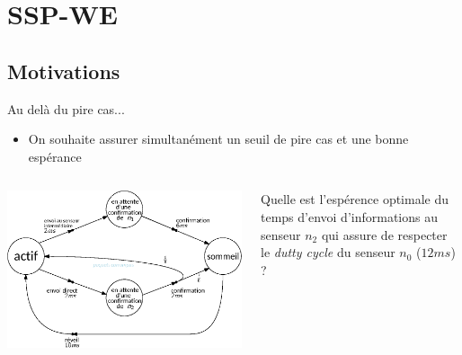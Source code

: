 \documentclass[compress]{beamer}
\theoremstyle{theorem}%
\begin{document}
\section{SSP-WE}
\subsection{Motivations}
\begin{frame}{Au delà du pire cas...}
  \begin{itemize}
    \item On souhaite assurer simultanément un {\color{fibeamer@orange}seuil de pire cas} et une {\color{fibeamer@orange}bonne espérance}
  \end{itemize}
  \begin{columns}
    \begin{column}{0.5\linewidth}
      \includegraphics[width=\linewidth]{resources/main-mdp}
    \end{column}
    \begin{column}{0.5\linewidth}
      Quelle est l'espérence optimale du temps d'envoi d'informations au senseur $n_2$ qui assure de respecter le \textit{dutty cycle} du senseur $n_0$ ($12 ms$)  ?
    \end{column}
  \end{columns}
\end{frame}
\end{document}
